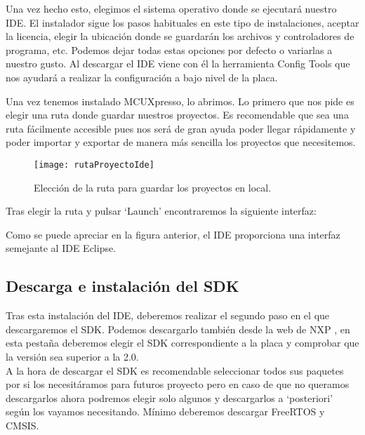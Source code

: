 
Una vez hecho esto, elegimos el sistema operativo donde se ejecutará nuestro IDE. El instalador sigue los pasos habituales en este tipo de instalaciones, aceptar la licencia, elegir la ubicación donde se guardarán los archivos y controladores de programa, etc. Podemos dejar todas estas opciones por defecto o variarlas a nuestro gusto. 
Al descargar el IDE viene con él la herramienta Config Tools que nos ayudará a realizar la configuración a bajo nivel de la placa. 



Una vez tenemos instalado MCUXpresso, lo abrimos. Lo primero que nos pide es elegir una ruta donde guardar nuestros proyectos. Es recomendable que sea una ruta fácilmente accesible pues nos será de gran ayuda poder llegar rápidamente y poder importar y exportar de manera más sencilla los proyectos que necesitemos.

\begin{figure}[!h]
	\centering
	\texttt{[image: rutaProyectoIde]}
	\caption{Elección de la ruta para guardar los proyectos en local.}
\end{figure}
\FloatBarrier

Tras elegir la ruta y pulsar `Launch' encontraremos la siguiente interfaz:


Como se puede apreciar en la figura anterior, el IDE proporciona una interfaz semejante al IDE Eclipse.


\subsection{Descarga e instalación del SDK}
Tras esta instalación del IDE, deberemos realizar el segundo paso en el que descargaremos el SDK. Podemos descargarlo también desde la web de NXP \cite{DLSDK}, en esta pestaña deberemos elegir el SDK correspondiente a la placa y comprobar que la versión sea superior a la 2.0. \\
A la hora de descargar el SDK es recomendable seleccionar todos sus paquetes por si los necesitáramos para futuros proyecto pero en caso de que no queramos descargarlos ahora podremos elegir solo algunos y descargarlos a `posteriori' según los vayamos necesitando. Mínimo deberemos descargar FreeRTOS y CMSIS.


